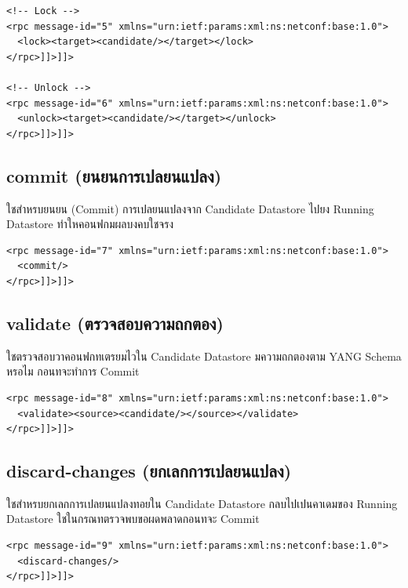 {\fontsize{13}{14}\selectfont
\begin{verbatim}
<!-- Lock -->
<rpc message-id="5" xmlns="urn:ietf:params:xml:ns:netconf:base:1.0">
  <lock><target><candidate/></target></lock>
</rpc>]]>]]>

<!-- Unlock -->
<rpc message-id="6" xmlns="urn:ietf:params:xml:ns:netconf:base:1.0">
  <unlock><target><candidate/></target></unlock>
</rpc>]]>]]>
\end{verbatim}
}

\subsection{commit (ยนยนการเปลยนแปลง)}
\hspace*{1.3em}
ใชสำหรบยนยน (Commit) การเปลยนแปลงจาก Candidate Datastore ไปยง Running Datastore ทำใหคอนฟกมผลบงคบใชจรง

{\fontsize{13}{14}\selectfont
\begin{verbatim}
<rpc message-id="7" xmlns="urn:ietf:params:xml:ns:netconf:base:1.0">
  <commit/>
</rpc>]]>]]>
\end{verbatim}
}

\subsection{validate (ตรวจสอบความถกตอง)}
\hspace*{1.3em}
ใชตรวจสอบวาคอนฟกทเตรยมไวใน Candidate Datastore มความถกตองตาม YANG Schema หรอไม กอนทจะทำการ Commit

{\fontsize{13}{14}\selectfont
\begin{verbatim}
<rpc message-id="8" xmlns="urn:ietf:params:xml:ns:netconf:base:1.0">
  <validate><source><candidate/></source></validate>
</rpc>]]>]]>
\end{verbatim}
}

\subsection{discard-changes (ยกเลกการเปลยนแปลง)}
\hspace*{1.3em}
ใชสำหรบยกเลกการเปลยนแปลงทอยใน Candidate Datastore กลบไปเปนคาเดมของ Running Datastore ใชในกรณทตรวจพบขอผดพลาดกอนทจะ Commit

{\fontsize{13}{14}\selectfont
\begin{verbatim}
<rpc message-id="9" xmlns="urn:ietf:params:xml:ns:netconf:base:1.0">
  <discard-changes/>
</rpc>]]>]]>
\end{verbatim}
}


